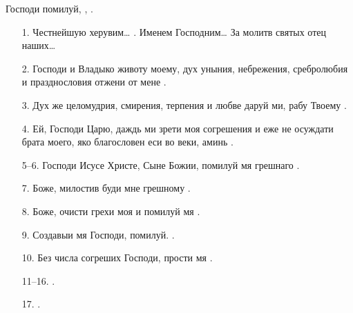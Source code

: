 \begin{mymulticols}
Господи помилуй, ,  .

\ifpdf
 \begin{enumerate}

 \item[{\footnotesize 1.}] Честнейшую херувим… . Именем Господним… За молитв святых отец наших…


 \item[{\footnotesize 2.}] Господи и Владыко животу моему, дух уныния, небрежения, сребролюбия и празднословия отжени от мене .

 \item[{\footnotesize 3.}] Дух же целомудрия, смирения, терпения и любве даруй ми, рабу Твоему .

 \item[{\footnotesize 4.}] Ей, Господи Царю, даждь ми зрети моя согрешения и еже не осуждати брата моего, яко благословен еси во веки, аминь .

 \item[{\footnotesize 5--6.}] Господи Исусе Христе, Сыне Божии, помилуй мя грешнаго .

 \item[{\footnotesize 7.}] Боже, милостив буди мне грешному .

 \item[{\footnotesize 8.}] Боже, очисти грехи моя и помилуй мя .

 \item[{\footnotesize 9.}] Создавыи мя Господи, помилуй. .

 \item[{\footnotesize 10.}] Без числа согреших Господи, прости мя .

 \item[{\footnotesize 11--16.}] .

 \item[{\footnotesize 17.}] .

 \end{enumerate}
\else
 \begin{tabular}{rl}


\end{tabular}
\end{mymulticols}
